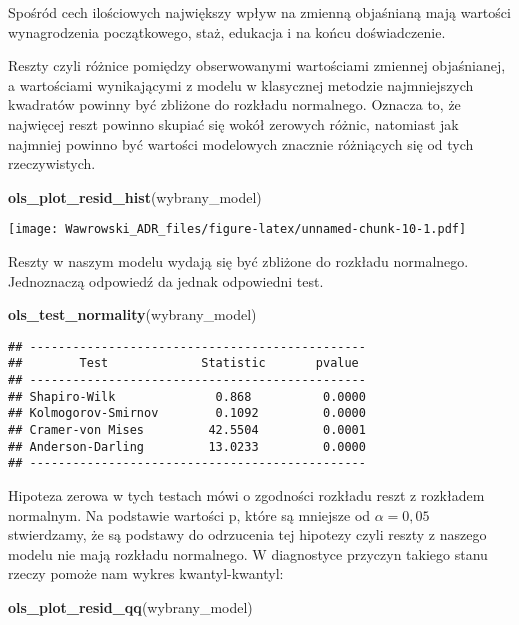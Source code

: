 \documentclass[]{book}
\newenvironment{Shaded}{\begin{snugshade}}{\end{snugshade}}
\newcommand{\KeywordTok}[1]{\textcolor[rgb]{0.13,0.29,0.53}{\textbf{#1}}}
\newcommand{\NormalTok}[1]{#1}
\begin{document}
Spośród cech ilościowych największy wpływ na zmienną objaśnianą mają
wartości wynagrodzenia początkowego, staż, edukacja i na końcu
doświadczenie.

Reszty czyli różnice pomiędzy obserwowanymi wartościami zmiennej
objaśnianej, a wartościami wynikającymi z modelu w klasycznej metodzie
najmniejszych kwadratów powinny być zbliżone do rozkładu normalnego.
Oznacza to, że najwięcej reszt powinno skupiać się wokół zerowych
różnic, natomiast jak najmniej powinno być wartości modelowych znacznie
różniących się od tych rzeczywistych.

\begin{Shaded}
\begin{Highlighting}[]
\KeywordTok{ols_plot_resid_hist}\NormalTok{(wybrany_model)}
\end{Highlighting}
\end{Shaded}

\texttt{[image: Wawrowski\_ADR\_files/figure-latex/unnamed-chunk-10-1.pdf]}

Reszty w naszym modelu wydają się być zbliżone do rozkładu normalnego.
Jednoznaczą odpowiedź da jednak odpowiedni test.

\begin{Shaded}
\begin{Highlighting}[]
\KeywordTok{ols_test_normality}\NormalTok{(wybrany_model)}
\end{Highlighting}
\end{Shaded}

\begin{verbatim}
## -----------------------------------------------
##        Test             Statistic       pvalue  
## -----------------------------------------------
## Shapiro-Wilk              0.868          0.0000 
## Kolmogorov-Smirnov        0.1092         0.0000 
## Cramer-von Mises         42.5504         0.0001 
## Anderson-Darling         13.0233         0.0000 
## -----------------------------------------------
\end{verbatim}

Hipoteza zerowa w tych testach mówi o zgodności rozkładu reszt z
rozkładem normalnym. Na podstawie wartości p, które są mniejsze od
\(\alpha=0,05\) stwierdzamy, że są podstawy do odrzucenia tej hipotezy
czyli reszty z naszego modelu nie mają rozkładu normalnego. W
diagnostyce przyczyn takiego stanu rzeczy pomoże nam wykres
kwantyl-kwantyl:

\begin{Shaded}
\begin{Highlighting}[]
\KeywordTok{ols_plot_resid_qq}\NormalTok{(wybrany_model)}
\end{Highlighting}
\end{Shaded}
\end{document}
